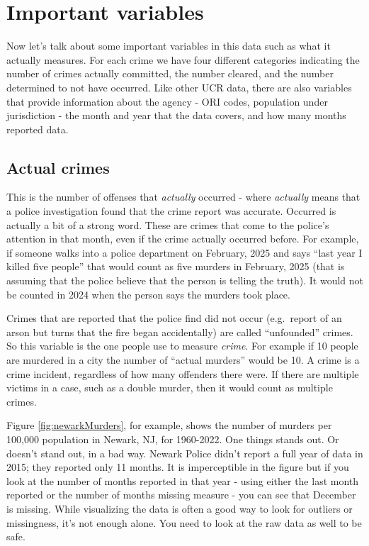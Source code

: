 \documentclass[
  12pt,
  openany]{book}
\begin{document}
\section{Important variables}\label{important-variables}

Now let's talk about some important variables in this data such as what it actually measures. For each crime we have four different categories indicating the number of crimes actually committed, the number cleared, and the number determined to not have occurred. Like other UCR data, there are also variables that provide information about the agency - ORI codes, population under jurisdiction - the month and year that the data covers, and how many months reported data.

\subsection{Actual crimes}\label{actual}

This is the number of offenses that \emph{actually} occurred - where \emph{actually} means that a police investigation found that the crime report was accurate. Occurred is actually a bit of a strong word. These are crimes that come to the police's attention in that month, even if the crime actually occurred before. For example, if someone walks into a police department on February, 2025 and says ``last year I killed five people'' that would count as five murders in February, 2025 (that is assuming that the police believe that the person is telling the truth). It would not be counted in 2024 when the person says the murders took place.

Crimes that are reported that the police find did not occur (e.g.~report of an arson but turns that the fire began accidentally) are called ``unfounded'' crimes. So this variable is the one people use to measure \emph{crime}. For example if 10 people are murdered in a city the number of ``actual murders'' would be 10. A crime is a crime incident, regardless of how many offenders there were. If there are multiple victims in a case, such as a double murder, then it would count as multiple crimes.

Figure \ref{fig:newarkMurders}, for example, shows the number of murders per 100,000 population in Newark, NJ, for 1960-2022. One things stands out. Or doesn't stand out, in a bad way. Newark Police didn't report a full year of data in 2015; they reported only 11 months. It is imperceptible in the figure but if you look at the number of months reported in that year - using either the last month reported or the number of months missing measure - you can see that December is missing. While visualizing the data is often a good way to look for outliers or missingness, it's not enough alone. You need to look at the raw data as well to be safe.
\end{document}
